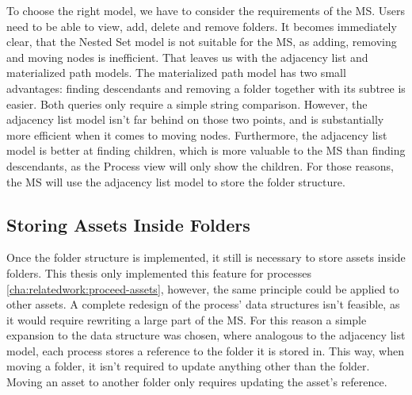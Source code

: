 To choose the right model, we have to consider the requirements of the MS.
Users need to be able to view, add, delete and remove folders.
It becomes immediately clear, that the Nested Set model is not suitable for the MS, as
adding, removing and moving nodes is inefficient.
That leaves us with the adjacency list and materialized path models.
%
The materialized path model has two small advantages: finding descendants and removing a
folder together with its subtree is easier.
Both queries only require a simple string comparison.
%
%
However, the adjacency list model isn't far behind on those two points, and is
substantially more efficient when it comes to moving nodes.
Furthermore, the adjacency list model is better at finding children, which is more
valuable to the MS than finding descendants, as the Process view will only show the
children.
For those reasons, the MS will use the adjacency list model to store the folder structure.

\subsection{Storing Assets Inside Folders}

Once the folder structure is implemented, it still is necessary to store assets inside
folders.
This thesis only implemented this feature for processes
\ref{cha:relatedwork:proceed-assets}, however, the same principle could be applied to
other assets.
A complete redesign of the process' data structures isn't feasible, as it would require
rewriting a large part of the MS.
For this reason a simple expansion to the data structure was chosen, where analogous to
the adjacency list model, each process stores a reference to the folder it is stored in.
This way, when moving a folder, it isn't required to update anything other than the
folder.
Moving an asset to another folder only requires updating the asset's reference.




